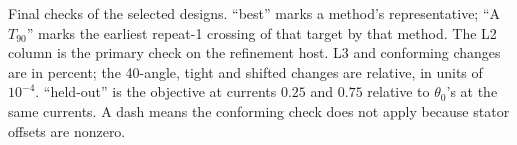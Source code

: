 \begin{table}[H]\centering\scriptsize
\caption{Final checks of the selected designs. ``best'' marks a method's
representative; ``A $T_{90}$'' marks the earliest repeat-1 crossing of that
target by that method. The L2 column is the primary check on the
refinement host. L3 and conforming changes are in percent; the 40-angle,
tight and shifted changes are relative, in units of $10^{-4}$. ``held-out'' is the objective at currents $0.25$ and
$0.75$ relative to $\theta_0$'s at the same currents. A dash means the
conforming check does not apply because stator offsets are nonzero.}
\label{tab:exp2-refinement}
\end{table}
